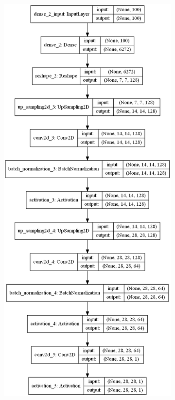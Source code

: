 \documentclass[conference]{IEEEtran}
\begin{document}
\begin{figure}
\begin{subfigure}[b]{\columnwidth}
         \includegraphics[width=\textwidth,height=\textheight,keepaspectratio]{generator_dcgan.png}

\end{subfigure}
\end{figure}
\end{document}
